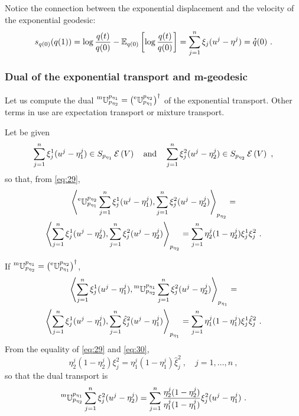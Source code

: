 \documentclass[12pt,a4paper]{amsart}
\theoremstyle{remark}
\begin{document}
Notice the connection between the exponential displacement and the velocity of the exponential geodesic:
\begin{equation}
  \label{eq:51}
  s_{q(0)}(q(1)) = \log \frac {q(t)}{q(0)} - \expectat {q(0)} {\log \frac {q(t)}{q(0)}} = \sum_{j=1}^n \xi_j(u^j - \eta^j) = \velocity q(0) \ .
\end{equation}

\subsubsection{Dual of the exponential transport and m-geodesic}
\label{sec:dual-expon-transp}
Let us compute the dual $\prescript{\text{m}}{} {\mathbb U} _ {p_{\eta_2}} ^ {p_{\eta_1}} = \left(\prescript{\text{e}}{} {\mathbb U} _ {p_{\eta_1}} ^ {p_{\eta_2}}\right)^\dagger$ of the exponential transport. Other terms in use are expectation transport or mixture transport.

Let be given
\begin{equation}
  \label{eq:38}
  \sum_{j=1}^n \xi_j^1(u^j - \eta^j_1) \in \expfibreat {p_{\eta_1}} V \quad \text{and} \quad \sum_{j=1}^n \xi_j^2(u^j - \eta^j_2) \in \expfibreat {p_{\eta_2}} V \ ,
\end{equation}
so that, from \cref{eq:29},
\begin{multline}
  \label{eq:39}
  \scalarat {p_{\eta_2}} {\etransport {p_{\eta_1}} {p_{\eta_2}}  \sum_{j=1}^n \xi_j^1(u^j - \eta^j_1)} {\sum_{j=1}^n \xi_j^2(u^j - \eta^j_2)} = \\
   \scalarat {p_{\eta_2}} {\sum_{j=1}^n \xi_j^1(u^j - \eta^j_2)} {\sum_{j=1}^n \xi_j^2(u^j - \eta^j_2)} = 
   \sum_{j=1}^n \eta^j_2(1-\eta^j_2) \xi_j^1 \xi_j^2 \ . 
 \end{multline}

If $\prescript{\text{m}}{} {\mathbb U} _ {p_{\eta_2}} ^ {p_{\eta_1}} = \left(\prescript{\text{e}}{} {\mathbb U} _ {p_{\eta_1}} ^ {p_{\eta_2}}\right)^\dagger$,
\begin{multline}
  \label{eq:39a}
  \scalarat {p_{\eta_1}} {\sum_{j=1}^n \xi_j^1(u^j - \eta^j_1)} {\mtransport {p_{\eta_2}} {p_{\eta_1}}\sum_{j=1}^n \xi_j^2(u^j - \eta^j_2)} = \\
   \scalarat {p_{\eta_1}} {\sum_{j=1}^n \xi_j^1(u^j - \eta^j_1)} {\sum_{j=1}^n \hat \xi_j^2(u^j - \eta^j_1)} = 
   \sum_{j=1}^n \eta^j_1(1-\eta^j_1) \xi_j^1 \hat \xi_j^2 \ . 
\end{multline}
From the equality of \cref{eq:29} and \cref{eq:30},
\begin{equation}
\eta^j_2(1-\eta^j_2) \xi_j^2 = \eta^j_1(1-\eta^j_1) \hat \xi_j^2 \ , \quad j=1,\dots,n \ ,
\end{equation}
so that the dual transport is
\begin{equation}
  \label{eq:39b}
\mtransport {p_{\eta_2}} {p_{\eta_1}} \sum_{j=1}^n \xi_j^2(u^j - \eta^j_2) = 
\sum_{j=1}^n \frac{\eta^j_2(1-\eta^j_2)} {\eta^j_1(1-\eta^j_1)} \xi_j^2 (u^j - \eta^j_1) \ .
\end{equation}
\end{document}
